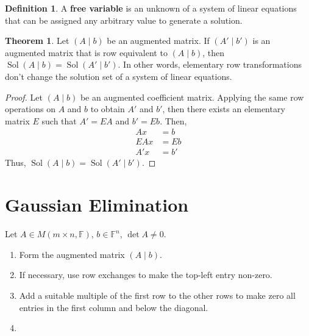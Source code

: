 \documentclass[letterpaper,12pt]{article}
\theoremstyle{definition}
\newtheorem*{definition}{Definition}
\newtheorem*{theorem}{Theorem}
\DeclareMathOperator{\sol}{Sol}
\begin{document}
\begin{definition}
A \textbf{free variable} is an unknown of a system of linear equations that can be assigned any arbitrary value to generate a solution.
\end{definition}

\begin{theorem}
Let $(A \mid b)$ be an augmented matrix. If $(A' \mid b')$ is an augmented matrix that is row equivalent to $(A \mid b)$, then $\sol{(A \mid b)} = \sol{(A' \mid b')}$. In other words, elementary row transformations don't change the solution set of a system of linear equations.
\begin{proof}
Let $(A \mid b)$ be an augmented coefficient matrix. Applying the same row operations on $A$ and $b$ to obtain $A'$ and $b'$, then there exists an elementary matrix $E$ such that $A' = EA$ and $b' = Eb$. Then,
\begin{align*}
    Ax & = b \\
    EAx & = Eb \\
    A'x & = b'
\end{align*}
Thus, $\sol{(A \mid b)} = \sol{(A' \mid b')}$.
\end{proof}
\end{theorem}

\section*{Gaussian Elimination}
Let $A \in M(m \times n, \mathbb{F})$, $b \in \mathbb{F}^n$, $\det{A} \neq 0$.
\begin{enumerate}
    \item Form the augmented matrix $(A \mid b)$.
    \item If necessary, use row exchanges to make the top-left entry non-zero.
    \item Add a suitable multiple of the first row to the other rows to make zero all entries in the first column and below the diagonal.
    \item 
\end{enumerate}
\end{document}
